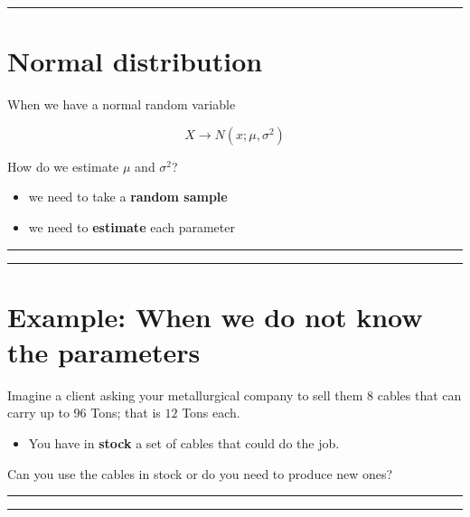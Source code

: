 \documentclass[
]{book}
\providecommand{\tightlist}{%
  \setlength{\itemsep}{0pt}\setlength{\parskip}{0pt}}
\begin{document}
\begin{center}\rule{0.5\linewidth}{0.5pt}\end{center}

\hypertarget{normal-distribution-8}{%
\section{Normal distribution}\label{normal-distribution-8}}

When we have a normal random variable

\[X \rightarrow N(x; \mu, \sigma^2)\]

How do we estimate \(\mu\) and \(\sigma^2\)?

\begin{itemize}
\item
  we need to take a \textbf{random sample}
\item
  we need to \textbf{estimate} each parameter
\end{itemize}

\begin{center}\rule{0.5\linewidth}{0.5pt}\end{center}

\begin{center}\rule{0.5\linewidth}{0.5pt}\end{center}

\hypertarget{example-when-we-do-not-know-the-parameters}{%
\section{Example: When we do not know the parameters}\label{example-when-we-do-not-know-the-parameters}}

Imagine a client asking your metallurgical company to sell them \(8\) cables that can carry up to \(96\) Tons; that is \(12\) Tons each.

\begin{itemize}
\tightlist
\item
  You have in \textbf{stock} a set of cables that could do the job.
\end{itemize}

Can you use the cables in stock or do you need to produce new ones?

\begin{center}\rule{0.5\linewidth}{0.5pt}\end{center}

\begin{center}\rule{0.5\linewidth}{0.5pt}\end{center}
\end{document}
